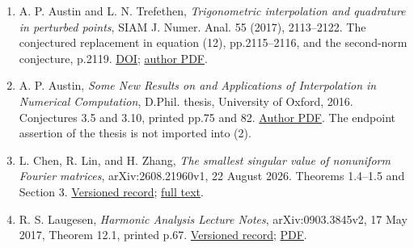 \documentclass[10pt,a4paper]{article}
\providecommand{\tightlist}{\setlength{\itemsep}{0pt}\setlength{\parskip}{0pt}}
\begin{document}
\begin{enumerate}
\def\labelenumi{\arabic{enumi}.}
\tightlist
\item
  A. P. Austin and L. N. Trefethen, \emph{Trigonometric interpolation
  and quadrature in perturbed points}, SIAM J. Numer. Anal. 55 (2017),
  2113--2122. The conjectured replacement in equation (12),
  pp.2115--2116, and the second-norm conjecture, p.2119.
  \href{https://doi.org/10.1137/16M1107760}{DOI};
  \href{https://people.maths.ox.ac.uk/trefethen/perturbed.pdf}{author
  PDF}.
\item
  A. P. Austin, \emph{Some New Results on and Applications of
  Interpolation in Numerical Computation}, D.Phil. thesis, University of
  Oxford, 2016. Conjectures 3.5 and 3.10, printed pp.75 and 82.
  \href{https://personal.math.vt.edu/apaustin/pubs/DPhilThesis.pdf}{Author
  PDF}. The endpoint assertion of the thesis is not imported into (2).
\item
  L. Chen, R. Lin, and H. Zhang, \emph{The smallest singular value of
  nonuniform Fourier matrices}, arXiv:2608.21960v1, 22 August 2026.
  Theorems 1.4--1.5 and Section 3.
  \href{https://arxiv.org/abs/2608.21960v1}{Versioned record};
  \href{https://arxiv.org/html/2608.21960v1}{full text}.
\item
  R. S. Laugesen, \emph{Harmonic Analysis Lecture Notes},
  arXiv:0903.3845v2, 17 May 2017, Theorem 12.1, printed p.67.
  \href{https://arxiv.org/abs/0903.3845v2}{Versioned record};
  \href{https://arxiv.org/pdf/0903.3845v2}{PDF}.
\end{enumerate}
\end{document}
